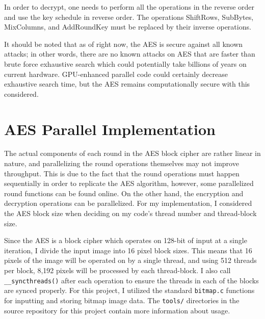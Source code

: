 \noindent In order to decrypt, one needs to perform all the operations in the reverse order and use the key schedule in reverse order. The operations ShiftRows, SubBytes, MixColumns, and AddRoundKey must be replaced by their inverse operations. 

\noindent It should be noted that as of right now, the AES is secure against all known attacks; in other words, there are no known attacks on AES that are faster than brute force exhaustive search which could potentially take billions of years on current hardware. GPU-enhanced parallel code could certainly decrease exhaustive search time, but the AES remains computationally secure with this considered.

\section{AES Parallel Implementation}
The actual components of each round in the AES block cipher are rather linear in nature, and parallelizing the round operations themselves may not improve throughput. This is due to the fact that the round operations must happen sequentially in order to replicate the AES algorithm, however, some parallelized round functions can be found online. On the other hand, the encryption and decryption operations can be parallelized. For my implementation, I considered the AES block size when deciding on my code's thread number and thread-block size.

\noindent Since the AES is a block cipher which operates on 128-bit of input at a single iteration, I divide the input image into 16 pixel block sizes. This means that 16 pixels of the image will be operated on by a single thread, and using 512 threads per block, 8,192 pixels will be processed by each thread-block. I also call \texttt{\_\_syncthreads()} after each operation to ensure the threads in each of the blocks are synced properly. For this project, I utilized the standard \texttt{bitmap.c} functions for inputting and storing bitmap image data. The \texttt{tools/} directories in the source repository for this project contain more information about usage.

